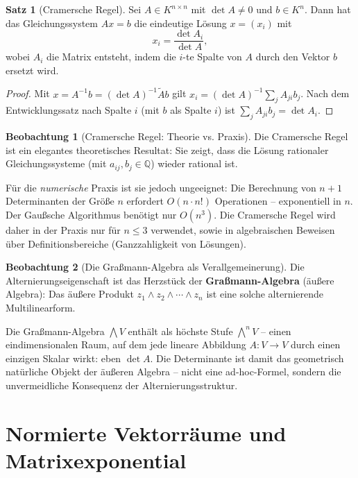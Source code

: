 ﻿\documentclass[a4paper,12pt]{report}
\theoremstyle{definition}
\newtheorem{satz}{Satz}
\newtheorem{beobachtung}{Beobachtung}
\begin{document}
\begin{satz}[Cramersche Regel]
    Sei $A \in K^{n \times n}$ mit $\det A \neq 0$ und $b \in K^n$.
    Dann hat das Gleichungssystem $Ax = b$ die eindeutige Lösung $x = (x_i)$
    mit
    \[
        x_i = \frac{\det A_i}{\det A},
    \]
    wobei $A_i$ die Matrix entsteht, indem die $i$-te Spalte von $A$
    durch den Vektor $b$ ersetzt wird.
\end{satz}
\begin{proof}
    Mit $x = A^{-1}b = (\det A)^{-1}\tilde{A} b$ gilt
    $x_i = (\det A)^{-1} \sum_j A_{ji} b_j$.
    Nach dem Entwicklungssatz nach Spalte $i$ (mit $b$ als Spalte $i$)
    ist $\sum_j A_{ji} b_j = \det A_i$.
\end{proof}

\begin{beobachtung}[Cramersche Regel: Theorie vs. Praxis]
    Die Cramersche Regel ist ein elegantes theoretisches Resultat:
    Sie zeigt, dass die Lösung rationaler Gleichungssysteme (mit
    $a_{ij}, b_j \in \mathbb{Q}$) wieder rational ist.

    Für die \emph{numerische} Praxis ist sie jedoch ungeeignet:
    Die Berechnung von $n+1$ Determinanten der Größe $n$ erfordert
    $O(n \cdot n!) $ Operationen -- exponentiell in $n$. Der Gaußsche
    Algorithmus benötigt nur $O(n^3)$.
    Die Cramersche Regel wird daher in der Praxis nur für $n \leq 3$
    verwendet, sowie in algebraischen Beweisen über Definitionsbereiche
    (Ganzzahligkeit von Lösungen).
\end{beobachtung}

\begin{beobachtung}[Die Graßmann-Algebra als Verallgemeinerung]
    Die Alternierungseigenschaft ist das Herzstück der
    \textbf{Gra\ss{}mann-Algebra} (äußere Algebra): Das äußere Produkt
    $z_1 \wedge z_2 \wedge \cdots \wedge z_n$ ist eine solche
    alternierende Multilinearform.

    Die Gra\ss{}mann-Algebra $\bigwedge V$ enthält als höchste Stufe
    $\bigwedge^n V$ -- einen eindimensionalen Raum, auf dem
    jede lineare Abbildung $A : V \to V$ durch einen einzigen Skalar
    wirkt: eben $\det A$. Die Determinante ist damit das
    geometrisch natürliche Objekt der äußeren Algebra -- nicht
    eine ad-hoc-Formel, sondern die unvermeidliche Konsequenz der
    Alternierungsstruktur.
\end{beobachtung}

\chapter{Normierte Vektorräume und Matrixexponential}
\end{document}
